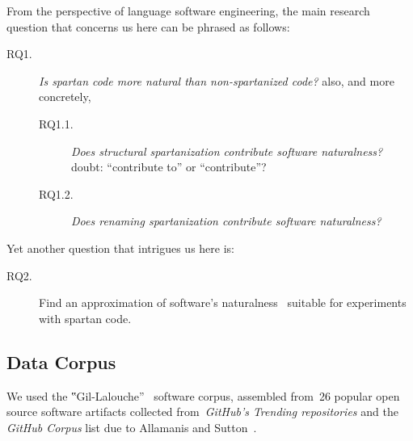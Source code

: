 From the perspective of  language software engineering, the main research
question that concerns us here can be phrased as follows:
\begin{description}
  \item[RQ1.] \emph{Is spartan code more natural than non-spartanized code?} also,
        and more concretely,
        \begin{description}
          \item[RQ1.1.] \emph{Does structural spartanization contribute software naturalness?}\matteo doubt: ``contribute to'' or ``contribute''?
          \item[RQ1.2.] \emph{Does renaming spartanization contribute software naturalness?}
        \end{description}
\end{description}
Yet another question that intrigues us here is:
\begin{description}
  \item[RQ2.] Find an approximation of software's
        naturalness~\cite{Hindle:Bar:Su:Gabel:Devanbu:12} suitable
        for experiments with spartan code.
\end{description}

\subsection{Data Corpus}
We used the ‟Gil-Lalouche”~\cite{Gil:Lalouche:16} software corpus,
assembled from~26 popular \Java open source software artifacts collected
from~\emph{GitHub's Trending
  repositories} and
the \emph{GitHub \Java Corpus}%
list due to Allamanis and Sutton~\cite{Allamanis:Sutton:13}.

